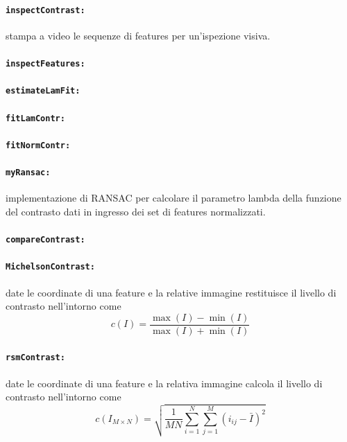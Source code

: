 \documentclass[12pt]{report}
\begin{document}
\paragraph*{\verb_inspectContrast:_} stampa a video le sequenze di features per un'ispezione visiva.

\paragraph*{\verb_inspectFeatures:_}

\paragraph*{\verb_estimateLamFit:_}

\paragraph*{\verb_fitLamContr:_}

\paragraph*{\verb_fitNormContr:_}

\paragraph*{\verb_myRansac:_} implementazione di RANSAC per calcolare il parametro lambda della funzione del contrasto dati in ingresso dei set di features normalizzati.

\paragraph*{\verb_compareContrast:_}

\paragraph*{\verb_MichelsonContrast:_} date le coordinate di una feature e la relative immagine restituisce il livello di contrasto nell'intorno come $$c\left(I\right) = \frac{\max(I)-\min(I)}{\max(I)+\min(I)}$$

\paragraph*{\verb_rsmContrast:_} date le coordinate di una feature e la relativa immagine calcola il livello di contrasto nell'intorno come $$ c\left(I_{M\times N}\right) = \sqrt{\frac{1}{MN}\sum_{i=1}^N\sum_{j=1}^M(i_{ij}-\bar{I})^2} $$
\end{document}
